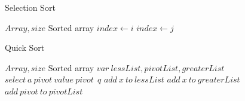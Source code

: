 \documentclass[paper=a4, fontsize=11pt,twoside]{scrartcl}		%
\begin{document}
\renewcommand{\algorithmicrequire}{\textbf{Input:}}
\renewcommand{\algorithmicensure}{\textbf{Output:}}
    \begin{algorithm}
        \caption{Selection Sort}
        \begin{algorithmic}[1] 
            \Require $Array,size$
            \Ensure Sorted array
                 \State $index \gets i$
                 	\State $index \gets j$
                 \EndIf
                \EndFor
                 \State {}
                \EndFor
            \EndFunction
        \end{algorithmic}
    \end{algorithm}
    
\renewcommand{\algorithmicrequire}{\textbf{Input:}}
\renewcommand{\algorithmicensure}{\textbf{Output:}}
    \begin{algorithm}
        \caption{Quick Sort}
        \begin{algorithmic}[1] 
            \Require $Array,size$
            \Ensure Sorted array
            \State $ var\ lessList, pivotList, greaterList$
                 \State {}
             \Else
             \State $select\ a\ pivot\ value\ pivot\ \ q$
                 \State $add\ x\ to\ lessList$
                 \EndIf
                 \State $add\ x\ to\ greaterList$
                 \EndIf
              \State $ add\ pivot\ to\ pivotList$
             \EndFor
            \State {}
           \EndIf
            \EndFunction
        \end{algorithmic}
    \end{algorithm}
    
\end{document}
